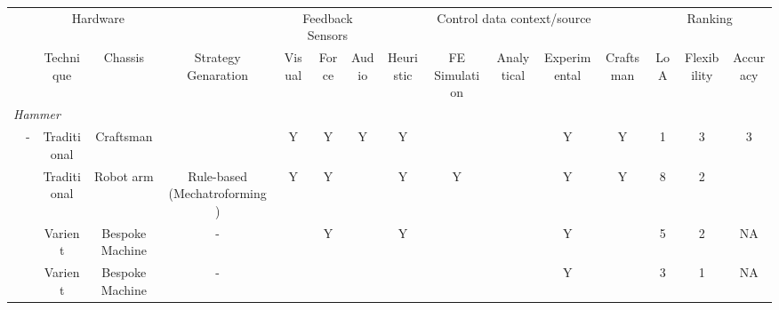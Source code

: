 \begin{tabular}{lccccccccccccccc} \toprule
 &                                                                                                                 & \multicolumn{2}{c}{Hardware}  &                                   & \multicolumn{3}{c}{Feedback Sensors} & \multicolumn{5}{c}{Control data   context/source}                 & \multicolumn{3}{c}{Ranking}  \\
\cmidrule(lr){3-4} \cmidrule(lr){6-8} \cmidrule(lr){9-13} \cmidrule(lr){14-16}
 &                                                                                                         & Technique   & Chassis         & Strategy Genaration               & Visual      & Force      & Audio     & Heuristic & FE Simulation & Analytical & Experimental & Craftsman & LoA & Flexibility & Accuracy \\
\midrule
\multicolumn{16}{l}{\textit{Hammer}}                                                                                                                                                                                                                                                                                                      \\
 & -                                                                                                               & Traditional & Craftsman       &                                   & Y           & Y          & Y         & Y         &               &            & Y            & Y         & 1   & 3           & 3        \\
 & \citep{Ilangovan2016AnForming}                                                                                  & Traditional & Robot arm       & Rule-based (Mechatroforming)      & Y           & Y          &           & Y         & Y             &            & Y            & Y         & 8   & 2           &          \\
 & \citep{Russo2020RaisingSpinning}                                                                                & Varient     & Bespoke Machine & -                                 &             & Y          &           & Y         &               &            & Y            &           & 5   & 2           & NA       \\
 & \citep{Yoon2001InvestigationMetal}                                                                              & Varient     & Bespoke Machine & -                                 &             &            &           &           &               &            & Y            &           & 3   & 1           & NA       \\

\end{tabular}
